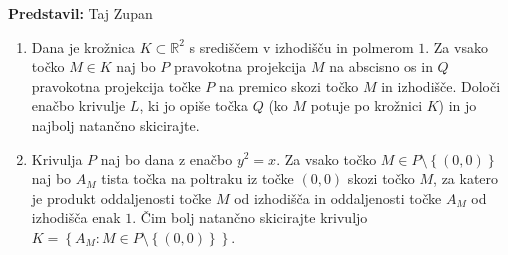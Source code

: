 \textbf{Predstavil:} Taj Zupan

\begin{enumerate}
  \item Dana je krožnica $K \subset \mathbb{R}^{2}$ s središčem v izhodišču in polmerom $1$. Za vsako točko $M \in K$ naj bo $P$ pravokotna projekcija $M$ na abscisno os in $Q$ pravokotna projekcija točke $P$ na premico skozi točko $M$ in izhodišče. Določi enačbo krivulje $L$, ki jo opiše točka $Q$ (ko $M$ potuje po krožnici $K$) in jo najbolj natančno skicirajte. 
  \item Krivulja $P$ naj bo dana z enačbo $y^{2} = x$. Za vsako točko $M\in P \setminus \left\{ \left( 0,0 \right) \right\}$ naj bo $A_{M}$ tista točka na poltraku iz točke $\left( 0,0 \right)$ skozi točko $M$, za katero je produkt oddaljenosti točke $M$ od izhodišča in oddaljenosti točke $A_{M}$ od izhodišča enak $1$. Čim bolj natančno skicirajte krivuljo $K=\left\{ A_M \colon M \in P \setminus \left\{ \left( 0,0 \right) \right\} \right\}$.
\end{enumerate}